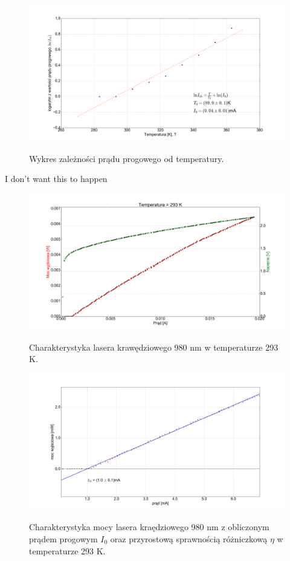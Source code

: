 \documentclass[a4paper, portrait,12pt]{report}
\begin{document}
\begin{figure}
\center
  \includegraphics[scale=0.30]{plot980/fit_i_th.png}
  \label{rys1}
  \caption{Wykres zależności prądu progowego od temperatury.} 
\end{figure}




\iffalse
I don't want this to happen

\begin{figure}
\center
  \includegraphics[scale=0.30]{plot980/temp_20_IVL.png}
  \label{rys1}
  \caption{Charakterystyka lasera krawędziowego 980 nm w temperaturze 293 K.} 
\end{figure}




\begin{figure}
\center
  \includegraphics[scale=0.30]{plot980/temp_20_fit.png}
  \label{rys1}
  \caption{Charakterystyka mocy lasera kraędziowego 980 nm z obliczonym prądem progowym $I_0$ oraz przyrostową sprawnością różniczkową $\eta$ w temperaturze 293 K.} 
\end{figure}
\end{document}
